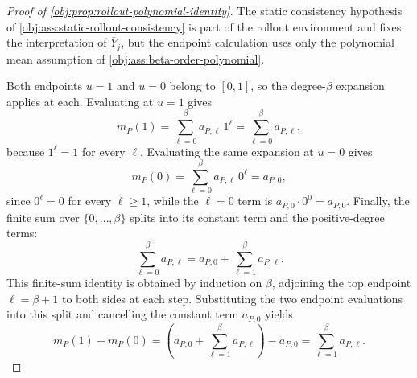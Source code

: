 \begin{proof}[Proof of \cref{obj:prop:rollout-polynomial-identity}]
The static consistency hypothesis of \cref{obj:ass:static-rollout-consistency} is part of the rollout environment and fixes the interpretation of \(\bar Y_j\), but the endpoint calculation uses only the polynomial mean assumption of \cref{obj:ass:beta-order-polynomial}.

Both endpoints \(u=1\) and \(u=0\) belong to \([0,1]\), so the degree-\(\beta\) expansion applies at each. Evaluating at \(u=1\) gives
\[
m_P(1)=\sum_{\ell=0}^{\beta}a_{P,\ell}\,1^\ell=\sum_{\ell=0}^{\beta}a_{P,\ell},
\]
because \(1^\ell=1\) for every \(\ell\). %
Evaluating the same expansion at \(u=0\) gives
\[
m_P(0)=\sum_{\ell=0}^{\beta}a_{P,\ell}\,0^\ell=a_{P,0},
\]
since \(0^\ell=0\) for every \(\ell\ge1\), while the \(\ell=0\) term is \(a_{P,0}\cdot 0^0=a_{P,0}\). %
Finally, the finite sum over \(\{0,\ldots,\beta\}\) splits into its constant term and the positive-degree terms:
\[
\sum_{\ell=0}^{\beta}a_{P,\ell}
=
a_{P,0}+\sum_{\ell=1}^{\beta}a_{P,\ell}.
\]
This finite-sum identity is obtained by induction on \(\beta\), adjoining the top endpoint \(\ell=\beta+1\) to both sides at each step. %
Substituting the two endpoint evaluations into this split and cancelling the constant term \(a_{P,0}\) yields
\[
m_P(1)-m_P(0)
=
\left(a_{P,0}+\sum_{\ell=1}^{\beta}a_{P,\ell}\right)-a_{P,0}
=
\sum_{\ell=1}^{\beta}a_{P,\ell}.
\] %
\end{proof}
